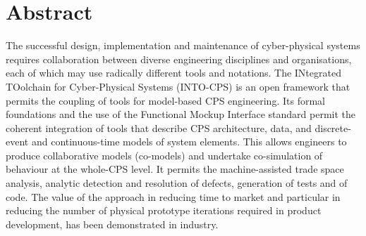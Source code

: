 \documentclass[a4paper,12pt,final]{include/intocpsassociation}   %
\begin{document}
\maketitle
%
%
%
\section*{Abstract}
\label{sec:abstract}
%
The successful design, implementation and maintenance of cyber-physical systems requires collaboration between diverse engineering disciplines and organisations, each of which may use radically different tools and notations.
The INtegrated TOolchain for Cyber-Physical Systems (INTO-CPS) is an open framework that permits the coupling of tools for model-based CPS engineering. Its formal foundations and the use of the Functional Mockup Interface standard permit the coherent integration of tools that describe CPS architecture, data, and discrete-event and continuous-time models of system elements. This allows engineers to produce collaborative models (co-models) and undertake co-simulation of behaviour at the whole-CPS level. It permits the machine-assisted trade space analysis, analytic detection and resolution of defects, generation of tests and of code. The value of the approach in reducing time to market and particular in reducing the number of physical prototype iterations required in product development, has been demonstrated in industry.
\end{document}
